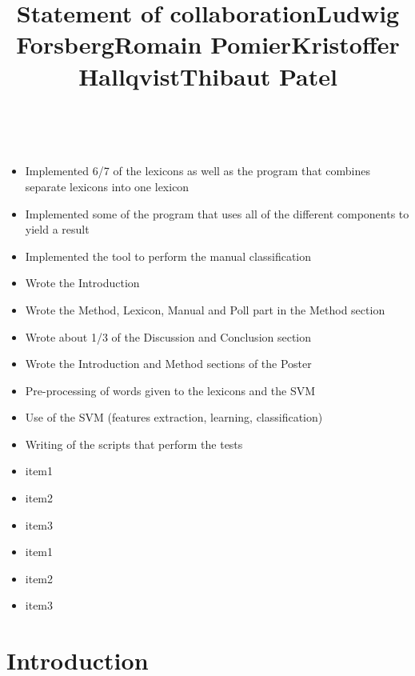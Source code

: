 \documentclass[a4paper,12pt]{report}
\begin{document}
\clearpage
\thispagestyle{empty}
\vspace*{2.15cm}
\title{\huge \textbf{Statement of collaboration}}
\vspace{1cm}\\
\title{\large \textbf{Ludwig Forsberg}}
\begin{itemize}
    \item Implemented 6/7 of the lexicons as well as the program that combines separate lexicons into one lexicon
    \item Implemented some of the program that uses all of the different components to yield a result
    \item Implemented the tool to perform the manual classification
    \item Wrote the Introduction
    \item Wrote the Method, Lexicon, Manual and Poll part in the Method section
    \item Wrote about 1/3 of the Discussion and Conclusion section
    \item Wrote the Introduction and Method sections of the Poster
\end{itemize}
\title{\large \textbf{Romain Pomier}}
\begin{itemize}
  \item Pre-processing of words given to the lexicons and the SVM
  \item Use of the SVM (features extraction, learning, classification)
  \item Writing of the scripts that perform the tests
\end{itemize}
\title{\large \textbf{Kristoffer Hallqvist}}
\begin{itemize}
  \item item1
  \item item2
  \item item3
\end{itemize}
\title{\large \textbf{Thibaut Patel}}
\begin{itemize}
  \item item1
  \item item2
  \item item3
\end{itemize}


\tableofcontents

\clearpage
\chapter{Introduction}
\end{document}
